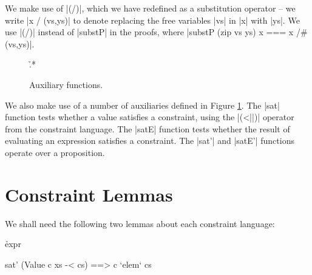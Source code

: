 We make use of |(/)|, which we have redefined as a substitution operator -- we write |x / (vs,ys)| to denote replacing the free variables |vs| in |x| with |ys|. We use |(/)| instead of |substP| in the proofs, where |substP (zip vs ys) x === x /# (vs,ys)|.

\begin{figure}
\h{.*}
\caption{Auxiliary functions.}
\label{figP:auxiliary}
\end{figure}

We also make use of a number of auxiliaries defined in Figure \ref{figP:auxiliary}. The |sat| function tests whether a value satisfies a constraint, using the |(<||)| operator from the constraint language. The |satE| function tests whether the result of evaluating an expression satisfies a constraint. The |sat'| and |satE'| functions operate over a proposition.

\section{Constraint Lemmas}
\label{secP:constraint}

We shall need the following two lemmas about each constraint language:


\h{expr}\begin{code}
sat' (Value c xs -< cs) ==> c `elem` cs
\end{code}


